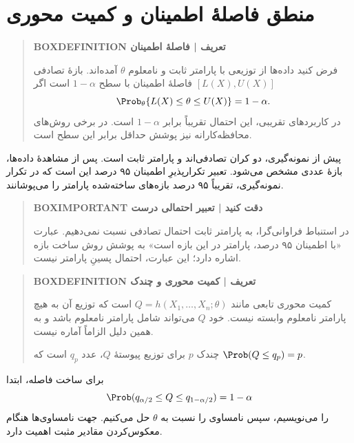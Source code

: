 \section{منطق فاصلهٔ اطمینان و کمیت محوری}
\begin{quote}\textbf{BOXDEFINITION تعریف | فاصلهٔ اطمینان}\par 
فرض کنید داده‌ها از توزیعی با پارامتر ثابت و نامعلوم $\theta$ آمده‌اند. بازهٔ تصادفی $[L(X),U(X)]$ فاصلهٔ اطمینان با سطح $1-\alpha$ است اگر
\[\Prob_\theta\{L(X)\le\theta\le U(X)\}=1-\alpha.\]
در کاربردهای تقریبی، این احتمال تقریباً برابر $1-\alpha$ است. در برخی روش‌های محافظه‌کارانه نیز پوشش حداقل برابر این سطح است.
\end{quote}
پیش از نمونه‌گیری، دو کران تصادفی‌اند و پارامتر ثابت است. پس از مشاهدهٔ داده‌ها، بازهٔ عددی مشخص می‌شود. تعبیر تکرارپذیرِ اطمینان ۹۵ درصد این است که در تکرار نمونه‌گیری، تقریباً ۹۵ درصد بازه‌های ساخته‌شده پارامتر را می‌پوشانند.
\begin{quote}\textbf{BOXIMPORTANT دقت کنید | تعبیر احتمالی درست}\par 
در استنباط فراوانی‌گرا، به پارامتر ثابت احتمال تصادفی نسبت نمی‌دهیم. عبارت «با اطمینان ۹۵ درصد، پارامتر در این بازه است» به پوشش روش ساخت بازه اشاره دارد؛ این عبارت، احتمال پسینِ پارامتر نیست.
\end{quote}
\begin{quote}\textbf{BOXDEFINITION تعریف | کمیت محوری و چندک}\par 
کمیت محوری تابعی مانند $Q=h(X_1,\ldots,X_n;\theta)$ است که توزیع آن به هیچ پارامتر نامعلوم وابسته نیست. خود $Q$ می‌تواند شامل پارامتر نامعلوم باشد و به همین دلیل الزاماً آماره نیست.

چندک $p$ برای توزیع پیوستهٔ $Q$، عدد $q_p$ است که $\Prob(Q\le q_p)=p$.
\end{quote}
برای ساخت فاصله، ابتدا
\[\Prob(q_{\alpha/2}\le Q\le q_{1-\alpha/2})=1-\alpha\]
را می‌نویسیم، سپس نامساوی را نسبت به $\theta$ حل می‌کنیم. جهت نامساوی‌ها هنگام معکوس‌کردن مقادیر مثبت اهمیت دارد.
